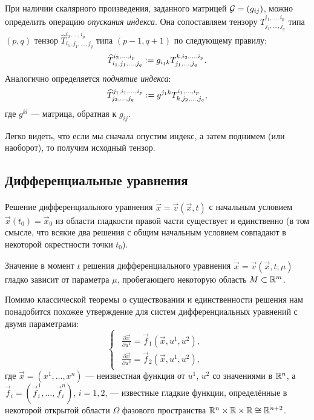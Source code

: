 \begin{definition}
	При наличии скалярного произведения, заданного матрицей $\mathcal{G} = (g_{ij})$, можно определить операцию \textit{опускания индекса}. Она сопоставляем тензору $T^{i_1, \ldots, i_p}_{j_1, \ldots, j_q}$ типа $(p, q)$ тензор $\widehat{T}^{i_2, \ldots, i_p}_{i_1, j_1, \ldots, j_q}$ типа $(p - 1, q + 1)$ по следующему правилу:
	\[
		\widehat{T}^{i_2, \ldots, i_p}_{i_1, j_1, \ldots, j_q} \vcentcolon = g_{i_1k}T^{k, i_2, \ldots, i_p}_{j_1, \ldots, j_q}.
	\]
	Аналогично определяется \textit{поднятие индекса}:
	\[
		\widehat{T}^{j_1, i_1,\ldots, i_p}_{j_2, \ldots, j_q} \vcentcolon = g^{j_1k}T^{i_1, \ldots, i_p}_{k, j_2, \ldots, j_q},
	\]
	где $g^{kl}$ --- матрица, обратная к $g_{ij}$.
\end{definition}

Легко видеть, что если мы сначала опустим индекс, а затем поднимем (или наоборот), то получим исходный тензор.

\subsection{Дифференциальные уравнения}

\begin{theorem}
	Решение дифференциального уравнения $\dot{\vec{x}} = \vec{v}(\vec{x}, t)$ с начальным условием $\vec{x}(t_0) = \vec{x}_0$ из области гладкости правой части существует и единственно (в том смысле, что всякие два решения с общим начальным условием совпадают в некоторой окрестности точки $t_0$).
\end{theorem}

\begin{theorem}
	Значение в момент $t$ решения дифференциального уравнения $\dot{\vec{x}} = \vec{v}(\vec{x}, t; \mu)$ гладко зависит от параметра $\mu$, пробегающего некоторую область $M \subset \mathbb{R}^m$.
\end{theorem}

Помимо классической теоремы о существовании и единственности решения нам понадобится похожее утверждение для систем дифференциальных уравнений с двумя параметрами:
\begin{equation} \label{eq:DiffSystem}
	\begin{cases}
		\begin{aligned}
			\frac{\partial\vec{x}}{\partial u^1} = \vec{f}_1(\vec{x}, u^1, u^2),\\
			\frac{\partial\vec{x}}{\partial u^2} = \vec{f}_2(\vec{x}, u^1, u^2),
		\end{aligned}
	\end{cases}
\end{equation}
где $\vec{x} = (x^1, \ldots, x^n)$ --- неизвестная функция от $u^1$, $u^2$ со значениями в $\mathbb{R}^n$, а $\vec{f}_i = (\vec{f}_i^1, \ldots, \vec{f}_i^n)$, $i = 1, 2$, --- известные гладкие функции, определённые в некоторой открытой области $\Omega$ фазового пространства $\mathbb{R}^n \times \mathbb{R} \times \mathbb{R} \cong \mathbb{R}^{n + 2}$.

